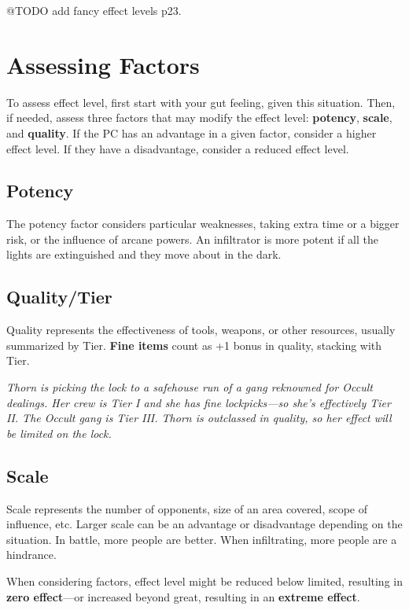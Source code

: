 \documentclass[11pt,oneside]{book}
\begin{document}
@TODO add fancy effect levels p23.

\section{Assessing Factors}

To assess effect level, first start with your gut feeling, given this situation. Then, if needed, assess three factors that may modify the effect level: \textbf{potency}, \textbf{scale}, and \textbf{quality}. If the PC has an advantage in a given factor, consider a higher effect level. If they have a disadvantage, consider a reduced effect level.

\subsection{Potency}

The potency factor considers particular weaknesses, taking extra time or a bigger risk, or the influence of arcane powers. An infiltrator is more potent if all the lights are extinguished and they move about in the dark.

\subsection{Quality/Tier}

Quality represents the effectiveness of tools, weapons, or other resources, usually summarized by Tier. \textbf{Fine items} count as +1 bonus in quality, stacking with Tier.

\emph{Thorn is picking the lock to a safehouse run of a gang reknowned for Occult dealings. Her crew is Tier I and she has fine lockpicks---so she’s effectively Tier II. The Occult gang is Tier III. Thorn is outclassed in quality, so her effect will be limited on the lock.}

\subsection{Scale}

Scale represents the number of opponents, size of an area covered, scope of influence, etc. Larger scale can be an advantage or disadvantage depending on the situation. In battle, more people are better. When infiltrating, more people are a hindrance.

When considering factors, effect level might be reduced below limited, resulting in \textbf{zero effect}---or increased beyond great, resulting in an \textbf{extreme effect}.
\end{document}
